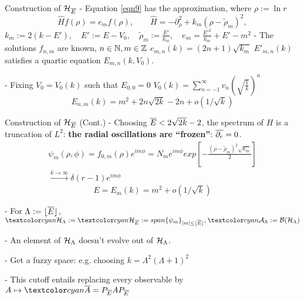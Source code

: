 \begin{frame}{Construction of $\mathcal H_{\overline{E}}$} %
    - Equation \eqref{eqn9} has the approximation, where $\rho := \ln r$
    \begin{equation}
        \label{harmonic2D}
        \hat H f(\rho) = e_m f(\rho), \qquad
        \hat H = - \partial_\rho^2 + k_m(\rho - \tilde \rho_m)^2,
    \end{equation} $
        k_m := 2(k - E'), \quad
        E' := E - V_0, \quad
        \tilde \rho_m := \frac{E'}{k_m}, \quad
        e_m = \frac{E'^2}{k_m} + E' - m^2
    $
    - The solutions $f_{n,m}$ are known, $n \in \mathbb N, m \in \mathbb Z$ \then $e_{m, n}(k) = (2n+1)\sqrt{k_m}$ \then $E'_{m,n}(k)$ satisfies a quartic equation \then $E_{m,n}(k, V_0)$.
    
    - Fixing $V_0 = V_0(k)$ such that $E_{0, 0} = 0$ \then $V_0(k) = %
    \sum_{n = -1}^\infty v_n \left( \sqrt{\frac{1}{k}} \right)^n$ \then
    \begin{equation}
        E_{n, m}(k) = m^2 + 2n\sqrt{2k} - 2n + o(1/\sqrt{k})
    \end{equation}
    
\end{frame}

\begin{frame}{Construction of $\mathcal H_{\overline{E}}$ (Cont.)}
    - Choosing $\overline{E} < 2 \sqrt{2k} - 2$, the spectrum of $H$ is a truncation of $L^2$: \textbf{the radial oscillations are ``frozen''}: $\overline{\partial_r} = 0$.
    \begin{multline*}
        \psi_m(\rho, \phi) = f_{0, m}(\rho) e^{im\phi} = N_m e^{im\phi}exp{\left[ -\frac{(\rho - \tilde \rho_m)^2 \sqrt{k_m}}{2} \right]} \\\xrightarrow{k \to \infty} \delta(r-1)e^{i m \phi}
    \end{multline*}
    \begin{equation}
        E = E_m(k) = m^2 + o(1/\sqrt{k})
    \end{equation}
    
    - For $\Lambda := \lfloor \overline{E} \rfloor$, 
        $\lbtext{\hcal_{\Lambda}}:= \lbtext{\hcal_{\cut E}} := span\{\psi_m\}_{|m| \leq 
    \lfloor \cut E \rfloor} ,
    \lbtext{\acal_\Lambda} := \mathcal B(\hcal_\Lambda)$
    
    - %
    An element of $\mathcal H_\Lambda$ doesn't evolve out of $\mathcal H_\Lambda$.
    
    - Get a fuzzy space: e.g. choosing $k = \Lambda^2(\Lambda+1)^2$ %
    
    - This cutoff entails replacing every observable by $A \mapsto \lbtext{\cut A} = P_{\cut E} A P_{\cut E}$%
\end{frame}

